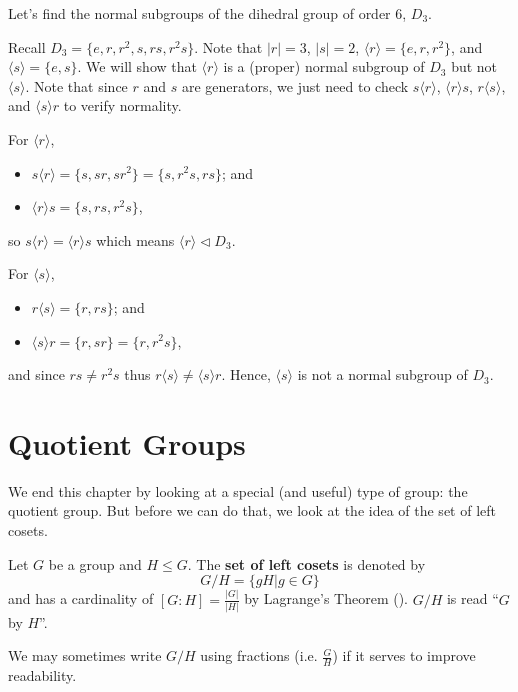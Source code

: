 \begin{example}\label{example-normal-subgroups-of-d3}
    Let's find the normal subgroups of the dihedral group of order 6, $D_3$.

    Recall $D_3 = \{e, r, r^2, s, rs, r^2s\}$. Note that $|r| = 3$, $|s| = 2$, $\langle r \rangle = \{e, r, r^2\}$, and $\langle s \rangle = \{e, s\}$. We will show that $\langle r \rangle$ is a (proper) normal subgroup of $D_3$ but not $\langle s \rangle$. Note that since $r$ and $s$ are generators, we just need to check $s\langle r\rangle$, $\langle r\rangle s$, $r\langle s\rangle$, and $\langle s\rangle r$ to verify normality.

    For $\langle r \rangle$,
    \begin{itemize}
        \item $s\langle r\rangle = \{s, sr, sr^2\} = \{s, r^2s, rs\}$; and
        \item $\langle r\rangle s = \{s, rs, r^2s\}$,
    \end{itemize}
    so $s\langle r\rangle = \langle r \rangle s$ which means $\langle r \rangle \lhd D_3$.

    For $\langle s \rangle$,
    \begin{itemize}
        \item $r\langle s\rangle = \{r, rs\}$; and
        \item $\langle s \rangle r = \{r, sr\} = \{r, r^2s\}$,
    \end{itemize}
    and since $rs \neq r^2s$ thus $r\langle s\rangle \neq \langle s \rangle r$. Hence, $\langle s \rangle$ is not a normal subgroup of $D_3$.
\end{example}

\section{Quotient Groups}
We end this chapter by looking at a special (and useful) type of group: the quotient group. But before we can do that, we look at the idea of the set of left cosets.

\begin{definition}
    Let $G$ be a group and $H \leq G$. The \textbf{set of left cosets} is denoted by
    \[
        G/H = \{gH \vert g \in G \}
    \]
    and has a cardinality of $[G:H] = \frac{|G|}{|H|}$ by Lagrange's Theorem (). $G/H$ is read ``$G$ by $H$''.
\end{definition}
\begin{remark}
    We may sometimes write $G/H$ using fractions (i.e. $\frac GH$) if it serves to improve readability.
\end{remark}

